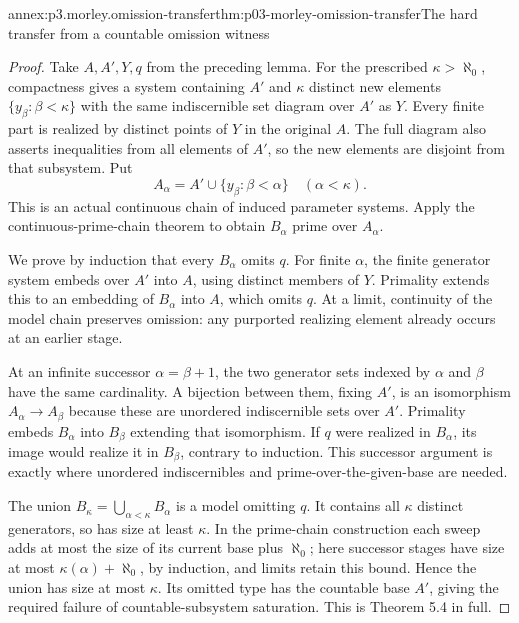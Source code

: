 \begin{annexitem}{annex:p3.morley.omission-transfer}{thm:p03-morley-omission-transfer}{The hard transfer from a countable omission witness}
\begin{proof}
Take \(A,A',Y,q\) from
the preceding lemma.
For the prescribed
\(\kappa>\aleph_0\),
compactness gives a
system containing
\(A'\) and \(\kappa\)
distinct new elements
\(\{y_\beta:\beta<\kappa\}\)
with the same indiscernible
set diagram over \(A'\)
as \(Y\). Every finite
part is realized by
distinct points of
\(Y\) in the original
\(A\). The full diagram
also asserts inequalities
from all elements of
\(A'\), so the new
elements are disjoint
from that subsystem.
Put
\[
 A_\alpha=A'\cup
             \{y_\beta:\beta<\alpha\}
                         \quad(\alpha<\kappa).
\]
This is an actual
continuous chain of
induced parameter
systems. Apply the
continuous-prime-chain
theorem to obtain
\(B_\alpha\) prime
over \(A_\alpha\).

We prove by induction
that every \(B_\alpha\)
omits \(q\). For
finite \(\alpha\),
the finite generator
system embeds over
\(A'\) into \(A\),
using distinct members
of \(Y\). Primality
extends this to an
embedding of \(B_\alpha\)
into \(A\), which
omits \(q\). At a
limit, continuity of
the model chain
preserves omission:
any purported realizing
element already occurs
at an earlier stage.

At an infinite
successor \(\alpha=\beta+1\),
the two generator
sets indexed by
\(\alpha\) and
\(\beta\) have the
same cardinality.
A bijection between
them, fixing \(A'\),
is an isomorphism
\(A_\alpha\to A_\beta\)
because these are
unordered indiscernible
sets over \(A'\).
Primality embeds
\(B_\alpha\) into
\(B_\beta\) extending
that isomorphism.
If \(q\) were realized
in \(B_\alpha\), its
image would realize
it in \(B_\beta\),
contrary to induction.
This successor argument
is exactly where
unordered indiscernibles
and prime-over-the-given-base
are needed.

The union
\(B_\kappa=\bigcup_{\alpha<\kappa}B_\alpha\)
is a model omitting
\(q\). It contains
all \(\kappa\)
distinct generators,
so has size at least
\(\kappa\). In the
prime-chain construction
each sweep adds at
most the size of its
current base plus
\(\aleph_0\); here
successor stages have
size at most
\(\kappa(\alpha)+\aleph_0\),
by induction, and
limits retain this
bound. Hence the
union has size at
most \(\kappa\).
Its omitted type
has the countable
base \(A'\), giving
the required failure
of countable-subsystem
saturation. This is
Theorem 5.4 in full.
\end{proof}
\end{annexitem}

